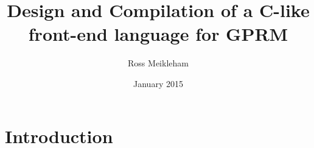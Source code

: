 \documentclass{l4proj}
\begin{document}
\title{Design and Compilation of a C-like front-end language for GPRM}
\author{Ross Meikleham}
\date{January 2015}
\maketitle

\begin{abstract}

\end{abstract}

\educationalconsent
%
%
\tableofcontents

\chapter{Introduction}












\end{document}

